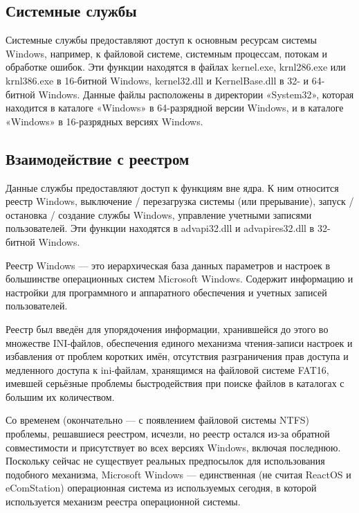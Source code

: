     \subsection{Системные службы}

    Системные службы предоставляют доступ к основным ресурсам системы Windows, например, к файловой системе, системным процессам, потокам и обработке ошибок.
    Эти функции находятся в файлах kernel.exe, krnl286.exe или krnl386.exe в 16-битной Windows, kernel32.dll и KernelBase.dll в 32- и 64-битной Windows.
    Данные файлы расположены в директории «System32», которая находится в каталоге «Windows» в 64-разрядной версии Windows, и в каталоге «Windows» в 16-разрядных версиях Windows.

    \subsection{Взаимодействие с реестром}

    Данные службы предоставляют доступ к функциям вне ядра.
    К ним относится реестр Windows, выключение / перезагрузка системы (или прерывание), запуск / остановка / создание службы Windows, управление учетными записями пользователей.
    Эти функции находятся в advapi32.dll и advapires32.dll в 32-битной Windows.

    Реестр Windows — это иерархическая база данных параметров и настроек в большинстве операционных систем Microsoft Windows.
    Содержит информацию и настройки для программного и аппаратного обеспечения и учетных записей пользователей.

    Реестр был введён для упорядочения информации, хранившейся до этого во множестве INI-файлов, обеспечения единого механизма чтения-записи настроек и избавления от проблем коротких имён, отсутствия разграничения прав доступа и медленного доступа к ini-файлам, хранящимся на файловой системе FAT16, имевшей серьёзные проблемы быстродействия при поиске файлов в каталогах с большим их количеством.

    Со временем (окончательно — с появлением файловой системы NTFS) проблемы, решавшиеся реестром, исчезли, но реестр остался из-за обратной совместимости и присутствует во всех версиях Windows, включая последнюю.
    Поскольку сейчас не существует реальных предпосылок для использования подобного механизма, Microsoft Windows — единственная (не считая ReactOS и eComStation) операционная система из используемых сегодня, в которой используется механизм реестра операционной системы.

